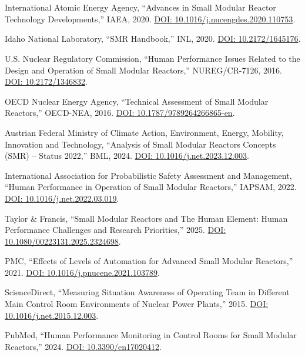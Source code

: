 \documentclass[conference]{IEEEtran}
\begin{document}
\begin{table}[t]
\begin{thebibliography}{54}
\\
\\

International Atomic Energy Agency, ``Advances in Small Modular Reactor Technology Developments,'' IAEA, 2020. \href{https://doi.org/10.1016/j.nucengdes.2020.110753}{DOI: 10.1016/j.nucengdes.2020.110753}.

Idaho National Laboratory, ``SMR Handbook,'' INL, 2020. \href{https://doi.org/10.2172/1645176}{DOI: 10.2172/1645176}.

U.S. Nuclear Regulatory Commission, ``Human Performance Issues Related to the Design and Operation of Small Modular Reactors,'' NUREG/CR-7126, 2016. \href{https://doi.org/10.2172/1346832}{DOI: 10.2172/1346832}.

OECD Nuclear Energy Agency, ``Technical Assessment of Small Modular Reactors,'' OECD-NEA, 2016. \href{https://doi.org/10.1787/9789264266865-en}{DOI: 10.1787/9789264266865-en}.

Austrian Federal Ministry of Climate Action, Environment, Energy, Mobility, Innovation and Technology, ``Analysis of Small Modular Reactors Concepts (SMR) – Status 2022,'' BML, 2024. \href{https://doi.org/10.1016/j.net.2023.12.003}{DOI: 10.1016/j.net.2023.12.003}.

International Association for Probabilistic Safety Assessment and Management, ``Human Performance in Operation of Small Modular Reactors,'' IAPSAM, 2022. \href{https://doi.org/10.1016/j.net.2022.03.019}{DOI: 10.1016/j.net.2022.03.019}.

Taylor & Francis, ``Small Modular Reactors and The Human Element: Human Performance Challenges and Research Priorities,'' 2025. \href{https://doi.org/10.1080/00223131.2025.2324698}{DOI: 10.1080/00223131.2025.2324698}.

PMC, ``Effects of Levels of Automation for Advanced Small Modular Reactors,'' 2021. \href{https://doi.org/10.1016/j.pnucene.2021.103789}{DOI: 10.1016/j.pnucene.2021.103789}.

ScienceDirect, ``Measuring Situation Awareness of Operating Team in Different Main Control Room Environments of Nuclear Power Plants,'' 2015. \href{https://doi.org/10.1016/j.net.2015.12.003}{DOI: 10.1016/j.net.2015.12.003}.

PubMed, ``Human Performance Monitoring in Control Rooms for Small Modular Reactors,'' 2024. \href{https://doi.org/10.3390/en17020412}{DOI: 10.3390/en17020412}.


\end{thebibliography}
\end{table}
\end{document}
